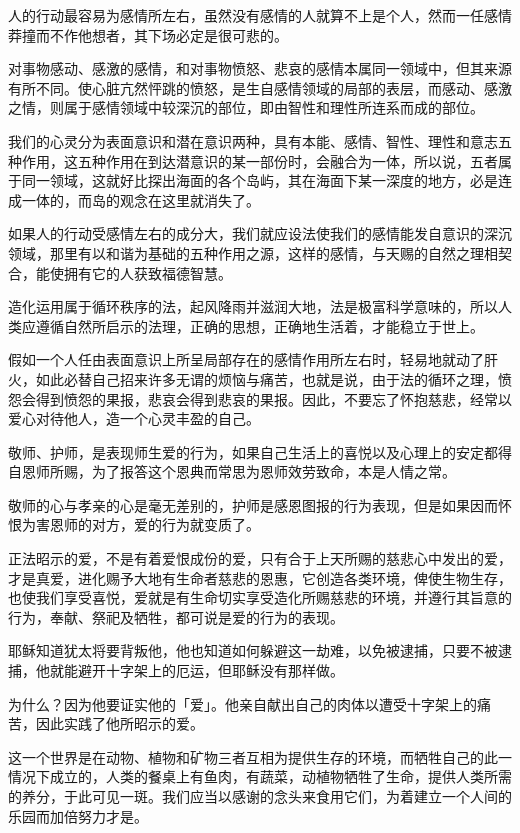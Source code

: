 \documentclass[twoside,openany]{book}
\begin{document}
人的行动最容易为感情所左右，虽然没有感情的人就算不上是个人，然而一任感情莽撞而不作他想者，其下场必定是很可悲的。

对事物感动、感激的感情，和对事物愤怒、悲哀的感情本属同一领域中，但其来源有所不同。使心脏亢然怦跳的愤怒，是生自感情领域的局部的表层，而感动、感激之情，则属于感情领域中较深沉的部位，即由智性和理性所连系而成的部位。

我们的心灵分为表面意识和潜在意识两种，具有本能、感情、智性、理性和意志五种作用，这五种作用在到达潜意识的某一部份时，会融合为一体，所以说，五者属于同一领域，这就好比探出海面的各个岛屿，其在海面下某一深度的地方，必是连成一体的，而岛的观念在这里就消失了。

如果人的行动受感情左右的成分大，我们就应设法使我们的感情能发自意识的深沉领域，那里有以和谐为基础的五种作用之源，这样的感情，与天赐的自然之理相契合，能使拥有它的人获致福德智慧。

造化运用属于循环秩序的法，起风降雨并滋润大地，法是极富科学意味的，所以人类应遵循自然所启示的法理，正确的思想，正确地生活着，才能稳立于世上。

假如一个人任由表面意识上所呈局部存在的感情作用所左右时，轻易地就动了肝火，如此必替自己招来许多无谓的烦恼与痛苦，也就是说，由于法的循环之理，愤怨会得到愤怨的果报，悲哀会得到悲哀的果报。因此，不要忘了怀抱慈悲，经常以爱心对待他人，造一个心灵丰盈的自己。

敬师、护师，是表现师生爱的行为，如果自己生活上的喜悦以及心理上的安定都得自恩师所赐，为了报答这个恩典而常思为恩师效劳致命，本是人情之常。

敬师的心与孝亲的心是毫无差别的，护师是感恩图报的行为表现，但是如果因而怀恨为害恩师的对方，爱的行为就变质了。

正法昭示的爱，不是有着爱恨成份的爱，只有合于上天所赐的慈悲心中发出的爱，才是真爱，进化赐予大地有生命者慈悲的恩惠，它创造各类环境，俾使生物生存，也使我们享受喜悦，爱就是有生命切实享受造化所赐慈悲的环境，并遵行其旨意的行为，奉献、祭祀及牺牲，都可说是爱的行为的表现。

耶稣知道犹太将要背叛他，他也知道如何躲避这一劫难，以免被逮捕，只要不被逮捕，他就能避开十字架上的厄运，但耶稣没有那样做。

为什么？因为他要证实他的「爱」。他亲自献出自己的肉体以遭受十字架上的痛苦，因此实践了他所昭示的爱。

这一个世界是在动物、植物和矿物三者互相为提供生存的环境，而牺牲自己的此一情况下成立的，人类的餐桌上有鱼肉，有蔬菜，动植物牺牲了生命，提供人类所需的养分，于此可见一斑。我们应当以感谢的念头来食用它们，为着建立一个人间的乐园而加倍努力才是。
\end{document}
